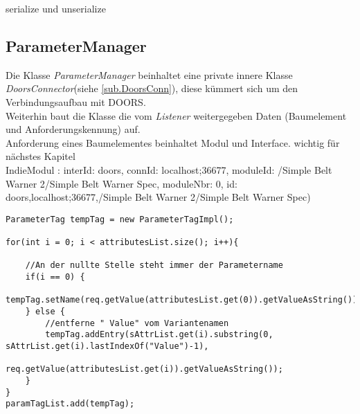 serialize und unserialize\\


\subsection{ParameterManager}\label{sub.ParameterManager}


Die Klasse \textit{ParameterManager} beinhaltet eine private innere Klasse \textit{DoorsConnector}(siehe \ref{sub.DoorsConn}), diese kümmert sich um den Verbindungsaufbau mit DOORS.\\ Weiterhin baut die Klasse die vom \textit{Listener} weitergegeben Daten (Baumelement und Anforderungskennung) auf.\\



Anforderung eines Baumelementes beinhaltet Modul und Interface. wichtig für nächstes Kapitel\\

IndieModul : interId: doors, connId: localhost;36677, moduleId: /Simple Belt Warner 2/Simple Belt Warner Spec, moduleNbr: 0, id: doors,localhost;36677,/Simple Belt Warner 2/Simple Belt Warner Spec)\\


\begin{lstlisting}[caption={Erstellung der ParameterTag}, captionpos=b,label={lst:CreateParamTag}]
ParameterTag tempTag = new ParameterTagImpl();
		
for(int i = 0; i < attributesList.size(); i++){
	
	//An der nullte Stelle steht immer der Parametername
	if(i == 0) {
		tempTag.setName(req.getValue(attributesList.get(0)).getValueAsString());
	} else {
		//entferne " Value" vom Variantenamen 
		tempTag.addEntry(sAttrList.get(i).substring(0, sAttrList.get(i).lastIndexOf("Value")-1),
				req.getValue(attributesList.get(i)).getValueAsString());
	}
}
paramTagList.add(tempTag);
\end{lstlisting}



